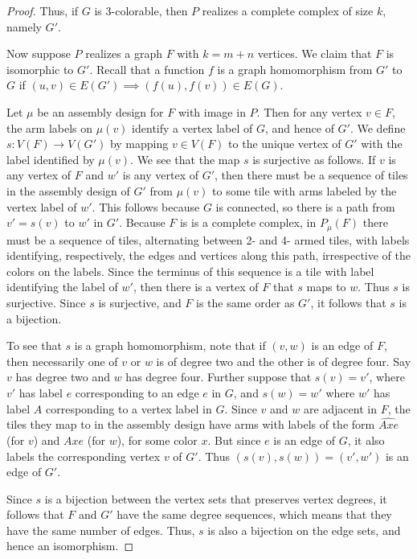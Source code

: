 \documentclass{elsarticle}
\theoremstyle{definition}
\theoremstyle{remark}
\theoremstyle{plain}
\theoremstyle{plain}
\begin{document}
\begin{proof}
 Thus, if $G$ is 3-colorable, then $P$ realizes a complete complex of size $k$, namely $G'$.

Now suppose $P$ realizes a graph $F$ with $k=m+n$ vertices. We claim that $F$ is isomorphic to $G'$. Recall that a function $f$ is a graph homomorphism from $G'$ to $G$ if $(u,v) \in E(G') \implies (f(u), f(v)) \in E(G)$.

Let $\mu$ be an assembly design for $F$ with image in $P$. Then for any vertex $v \in F$, the arm labels on $\mu(v)$ identify a vertex label of $G$, and hence of $G'$.  We define $s:V(F) \rightarrow V(G')$ by mapping $v \in V(F) $ to the unique vertex of $G'$ with the label identified by $\mu(v)$.   We see that the map $s$ is surjective as follows.  If $v$ is any vertex of $F$ and $w'$ is any vertex of $G'$, then there must be a sequence of tiles in the assembly design of $G'$ from  $\mu(v)$ to some tile with arms labeled by the vertex label of $w'$.  This follows because $G$ is connected, so there is a path from $v'=s(v)$ to $w'$ in $G'$.  Because $F$ is is a complete complex, in $P_{\mu}(F)$ there must be a sequence of tiles, alternating between 2- and 4- armed tiles, with labels identifying, respectively, the edges and vertices along this path, irrespective of the colors on the labels.  Since the terminus of this sequence is a tile with label identifying the label of $w'$, then there is a vertex of $F$ that $s$ maps to $w$.  Thus $s$ is surjective.  Since $s$ is surjective, and $F$ is the same order as $G'$, it follows that $s$ is a bijection.

To see that $s$ is a graph homomorphism, note that if $(v, w)$ is an edge of $F$, then necessarily one of $v$ or $w$ is of degree two and the other is of degree four.  Say $v$ has degree two and $w$ has degree four.     Further suppose that $s(v) =v'$, where $v'$ has label $e$ corresponding to an edge $e$ in $G$, and $s(w)=w'$  where $w'$ has label $A$ corresponding to a vertex label in $G$.  Since $v$ and $w$ are adjacent in $F$, the tiles they map to in the assembly design have arms with labels of the form $\widehat{Axe}$  (for $v$) and $Axe$    (for $w$), for some color $x$.  But since $e$ is an edge of $G$, it also labels the corresponding vertex $v$ of $G'$. Thus $(s(v), s(w))= (v', w')$ is an edge of $G'$.

Since $s$ is a bijection between the vertex sets that preserves vertex degrees, it follows that $F$ and $G'$ have the same degree sequences, which means that they have the same number of edges.  Thus, $s$ is also a bijection on the edge sets, and hence an isomorphism.


\end{proof}
\end{document}
